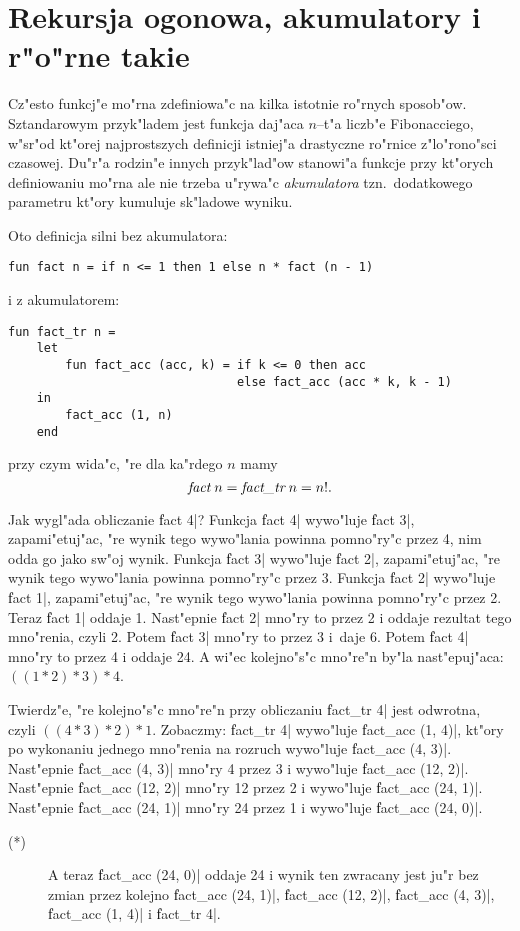 \chapter{
Rekursja ogonowa, akumulatory i r"o"rne takie
}

Cz"esto funkcj"e mo"rna zdefiniowa"c
na kilka istotnie ro"rnych sposob"ow.
Sztandarowym przyk"ladem jest funkcja daj"aca $n$--t"a
liczb"e Fibonacciego, w"sr"od kt"orej najprostszych
definicji istniej"a drastyczne ro"rnice z"lo"rono"sci czasowej.
Du"r"a rodzin"e innych przyk"lad"ow stanowi"a funkcje przy kt"orych
definiowaniu mo"rna ale nie trzeba u"rywa"c \emph{akumulatora}
tzn.\ dodatkowego parametru kt"ory kumuluje sk"ladowe wyniku.

Oto definicja silni bez akumulatora:
\begin{verbatim}
fun fact n = if n <= 1 then 1 else n * fact (n - 1)
\end{verbatim}
i z akumulatorem:
\begin{verbatim}
fun fact_tr n = 
    let
        fun fact_acc (acc, k) = if k <= 0 then acc 
                                else fact_acc (acc * k, k - 1)
    in
        fact_acc (1, n)
    end
\end{verbatim}
przy czym wida"c, "re dla ka"rdego $n$ mamy
 $$\f{fact} n = \f{fact\_tr} n = n!.$$

Jak wygl"ada obliczanie \|fact 4|?
Funkcja \|fact 4| wywo"luje \|fact 3|, zapami"etuj"ac, "re wynik tego wywo"lania
powinna pomno"ry"c przez 4, nim odda go jako sw"oj wynik.
Funkcja \|fact 3| wywo"luje \|fact 2|, zapami"etuj"ac, "re wynik tego wywo"lania
powinna pomno"ry"c przez 3.
Funkcja \|fact 2| wywo"luje \|fact 1|, zapami"etuj"ac, "re wynik tego wywo"lania
powinna pomno"ry"c przez 2. 
Teraz \|fact 1| oddaje 1. Nast"epnie \|fact 2| mno"ry to przez 2 i oddaje 
rezultat tego mno"renia, czyli 2. Potem \|fact 3| mno"ry to przez 3 i~daje 6. 
Potem \|fact 4| mno"ry to przez 4 i oddaje 24.
A wi"ec kolejno"s"c mno"re"n by"la nast"epuj"aca: $((1 * 2) * 3) * 4$.

\pagebreak

Twierdz"e, "re kolejno"s"c mno"re"n przy obliczaniu \|fact_tr 4|
jest odwrotna, czyli $((4 * 3) * 2) * 1$.
Zobaczmy: \|fact_tr 4| wywo"luje \|fact_acc (1, 4)|, kt"ory po wykonaniu
jednego mno"renia na rozruch wywo"luje \|fact_acc (4, 3)|.
Nast"epnie \|fact_acc (4, 3)| mno"ry 4 przez 3 i wywo"luje \|fact_acc (12, 2)|.
Nast"epnie \|fact_acc (12, 2)| mno"ry 12 przez 2 i wywo"luje \|fact_acc (24, 1)|.
Nast"epnie \|fact_acc (24, 1)| mno"ry 24 przez 1 i wywo"luje \|fact_acc (24, 0)|.
\begin{description}
\item[(*)] A teraz \|fact_acc (24, 0)| oddaje 24 
    i wynik ten zwracany jest ju"r bez zmian 
    przez kolejno \|fact_acc (24, 1)|,
    \|fact_acc (12, 2)|, \|fact_acc (4, 3)|, \|fact_acc (1, 4)| i \|fact_tr 4|.
\end{description}

